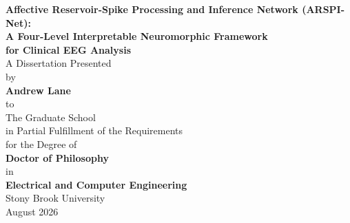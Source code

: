 \documentclass[12pt]{report}
\theoremstyle{definition}
\theoremstyle{remark}
\begin{document}

\begin{titlepage}
\singlespacing
\centering
\vspace*{1cm}
{\Large \textbf{Affective Reservoir-Spike Processing and Inference Network (ARSPI-Net):}}\\[0.5cm]
{\Large \textbf{A Four-Level Interpretable Neuromorphic Framework}}\\[0.3cm]
{\Large \textbf{for Clinical EEG Analysis}}\\[2cm]
{\large A Dissertation Presented}\\[0.3cm]
{\large by}\\[0.5cm]
{\Large \textbf{Andrew Lane}}\\[1cm]
{\large to}\\[0.3cm]
{\large The Graduate School}\\[0.3cm]
{\large in Partial Fulfillment of the Requirements}\\[0.3cm]
{\large for the Degree of}\\[0.5cm]
{\Large \textbf{Doctor of Philosophy}}\\[0.5cm]
{\large in}\\[0.1cm]
{\Large \textbf{Electrical and Computer Engineering}}\\[1.2cm]
{\large Stony Brook University}\\[0.4cm]
{\large August 2026}
\end{titlepage}
\end{document}
